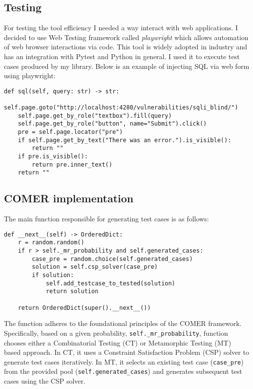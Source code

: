 \subsection{Testing}\label{sec:testing}

For testing the tool efficiency I needed a way interact with web applications. I decided to use Web Testing framework called \textit{playwright} \cite{playwright} which allows automation of web browser interactions via code. This tool is widely adopted in industry and has an integration with Pytest and Python in general. I used it to execute test cases produced by my library. Below is an example of injecting SQL via web form using playwright:

\begin{lstlisting}[label={lst:playwright}]
def sql(self, query: str) -> str:
	self.page.goto("http://localhost:4280/vulnerabilities/sqli_blind/")
	self.page.get_by_role("textbox").fill(query)
	self.page.get_by_role("button", name="Submit").click()
	pre = self.page.locator("pre")
	if self.page.get_by_text("There was an error.").is_visible():
		return ""
	if pre.is_visible():
		return pre.inner_text()
	return ""
\end{lstlisting}

\subsection{COMER implementation}\label{sec:comer-implementation}

The main function responsible for generating test cases is as follows:

\begin{lstlisting}[label={lst:test-cases}]
def __next__(self) -> OrderedDict:
	r = random.random()
	if r > self._mr_probability and self.generated_cases:
		case_pre = random.choice(self.generated_cases)
		solution = self.csp_solver(case_pre)
		if solution:
			self.add_testcase_to_tested(solution)
			return solution

	return OrderedDict(super().__next__())

\end{lstlisting}

The function adheres to the foundational principles of the COMER framework.
Specifically, based on a given probability, \verb|self._mr_probability|, function chooses either a Combinatorial Testing (CT) or Metamorphic Testing (MT) based approach.
In CT, it uses a Constraint Satisfaction Problem (CSP) solver to generate test cases iteratively.
In MT, it selects an existing test case (\verb|case_pre|) from the provided pool (\verb|self.generated_cases|) and generates subsequent test cases using the CSP solver.

